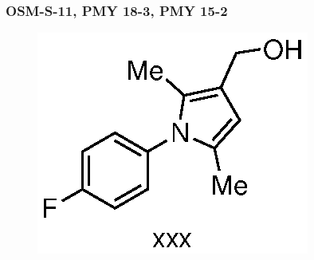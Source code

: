 \documentclass[12pt, a4paper,titlepage]{article}
\begin{document}
\subsubsection*{OSM-S-11, PMY 18-3, PMY 15-2}
 \label{exp:PMY15}
	\begin{figure}[H]
	\begin{center}
	\includegraphics{exp/PMY15.eps}
	\end{center}
	\vspace{-25pt}	
	\end{figure}	
\end{document}
